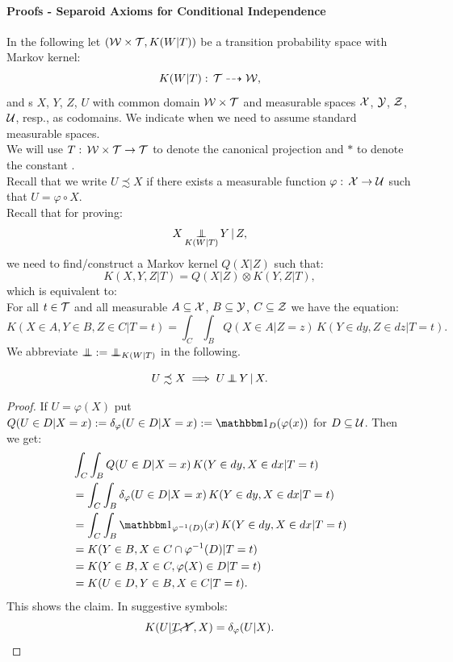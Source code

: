 \paragraph{Proofs - Separoid Axioms for Conditional Independence}\hfill%

In the following let $(\mathcal{W} \times \mathcal{T}, K(W|T))$ be a transition probability space with Markov kernel:
\[K(W|T): \, \mathcal{T} \dashrightarrow  \mathcal{W},\]
and \trv{}s $X$, $Y$, $Z$, $U$ with common domain $\mathcal{W}\times \mathcal{T}$ and measurable spaces $\mathcal{X}$, 
$\mathcal{Y}$, $\mathcal{Z}$, $\mathcal{U}$, resp., as codomains. We indicate when we need to assume standard measurable spaces.\\
We will use
$T:\, \mathcal{W} \times \mathcal{T} \to \mathcal{T}$ to denote the canonical projection and $\ast$ to denote the constant \trv{}.\\
Recall that we write $U \precsim X$ if there exists a measurable function  
$\varphi:\, \mathcal{X} \to \mathcal{U}$  such that $U = \varphi \circ X$.\\
Recall that for proving:
\[X \operatorname*{\perp\mkern-11mu\perp}_{K(W|T)} Y \operatorname*{|} Z, \]
we need to find/construct a Markov kernel $Q(X|Z)$ such that:
\[ K(X,Y,Z|T) = Q(X|Z) \otimes K(Y,Z|T),\]
which is equivalent to:\\ 
For all $t \in \mathcal{T}$ and all measurable $A \subseteq \mathcal{X}$, $B \subseteq \mathcal{Y}$, $C \subseteq \mathcal{Z}$ we have the equation:
\[ K(X \in A, Y \in B, Z \in C |T=t) = \int_C \int_B  Q(X \in A|Z=z)\, K(Y \in dy, Z \in dz|T=t). \]
We abbreviate $\operatorname*{\perp\mkern-11mu\perp} := \operatorname*{\perp\mkern-11mu\perp}_{K(W|T)}$ in the following.


\begin{Lem}
    \[U \precsim X \implies U \operatorname*{\perp\mkern-11mu\perp}  Y \operatorname*{|} X.\]
\begin{proof}
    If $U=\varphi(X)$ put
    $Q(U \in D|X=x):=\delta_\varphi(U \in D|X=x):=\I_D(\varphi(x))$ for $D \subseteq \mathcal{U}$. Then we get:
\begin{align*}
&\int_C \int_B  Q(U \in D|X=x)\, K(Y \in dy, X \in dx|T=t) \\
&= \int_C \int_B  \delta_\varphi(U \in D|X=x)\, K(Y \in dy, X \in dx|T=t) \\
&= \int_C \int_B  \I_{\varphi^{-1}(D)}(x) \, K(Y \in dy, X \in dx|T=t) \\
&= K(Y \in B, X \in C \cap \varphi^{-1}(D)|T=t) \\
&= K(Y \in B, X \in C, \varphi(X) \in D |T=t)\\
&= K(U \in D, Y \in B, X \in C |T=t).
\end{align*}
This shows the claim.
In suggestive symbols:
\[ K(U|\cancel{T,Y},X) = \delta_\varphi(U|X). \]
\end{proof}
\end{Lem}

